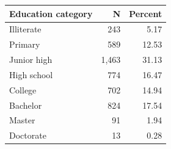 \begin{tabular}{lrr}
\toprule
Education category & N & Percent \\
\midrule
Illiterate & 243 & 5.17 \\
Primary & 589 & 12.53 \\
Junior high & 1,463 & 31.13 \\
High school & 774 & 16.47 \\
College & 702 & 14.94 \\
Bachelor & 824 & 17.54 \\
Master & 91 & 1.94 \\
Doctorate & 13 & 0.28 \\
\bottomrule
\end{tabular}
